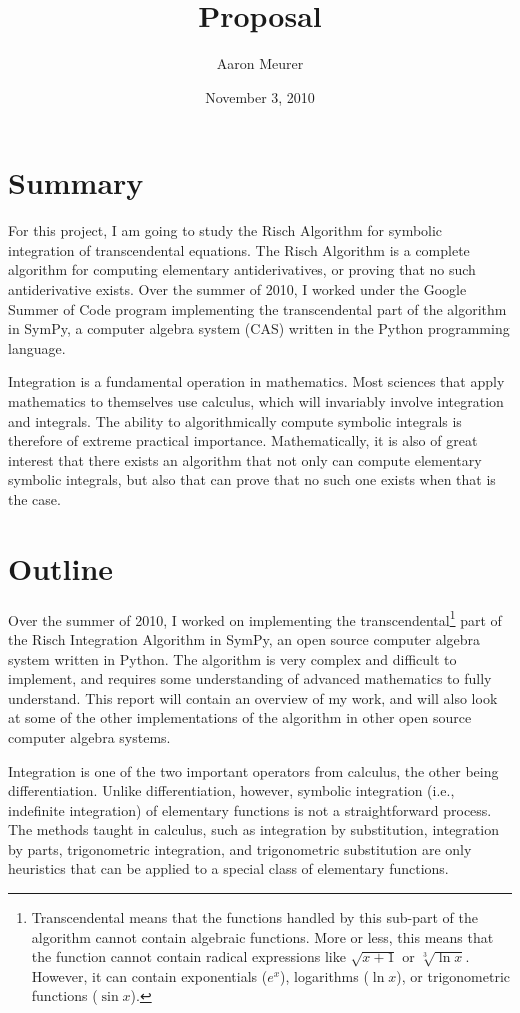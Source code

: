 \documentclass[12pt]{article}
\begin{document}
\title{Proposal}
\author{Aaron Meurer}
\date{November 3, 2010}
\maketitle
\section{Summary}
For this project, I am going to study the Risch Algorithm for symbolic
integration of transcendental equations.  The Risch Algorithm is a
complete algorithm for computing elementary antiderivatives, or proving
that no such antiderivative exists.  Over the summer of 2010, I worked
under the Goo\-gle Summer of Code program implementing the
transcendental part of the algorithm in Sym\-Py, a computer algebra
system (CAS) written in the Py\-thon programming language.

Integration is a fundamental operation in mathematics.  Most sciences
that apply mathematics to themselves use calculus, which will invariably
involve integration and integrals.  The ability to algorithmically
compute symbolic integrals is therefore of extreme practical importance.
 Mathematically, it is also of great interest that there exists an
algorithm that not only can compute elementary symbolic integrals, but
also that can prove that no such one exists when that is the case.

\section{Outline}
Over the summer of 2010, I worked on implementing the
transcendental\footnote{Transcendental means that the functions handled
by this sub-part of the algorithm cannot contain algebraic functions.
More or less, this means that the function cannot contain radical
expressions like $\sqrt{x + 1}$ or $\sqrt[3]{\ln{x}}$.  However, it can
contain exponentials ($e^x$), logarithms ($\ln{x}$), or trigonometric
functions ($\sin{x}$).} part of the Risch Integration Algorithm in
Sym\-Py, an open source computer algebra system written in Python.  The
algorithm is very complex and difficult to implement, and requires some
understanding of advanced mathematics to fully understand.  This report
will contain an overview of my work, and will also look at some of the
other implementations of the algorithm in other open source computer
algebra systems.

Integration is one of the two important operators from calculus, the
other being differentiation.  Unlike differentiation, however, symbolic
integration (i.e., indefinite integration) of elementary functions is
not a straightforward process. The methods taught in calculus, such as
integration by substitution, integration by parts, trigonometric
integration, and trigonometric substitution are only heuristics that can
be applied to a special class of elementary functions.  
\end{document}
